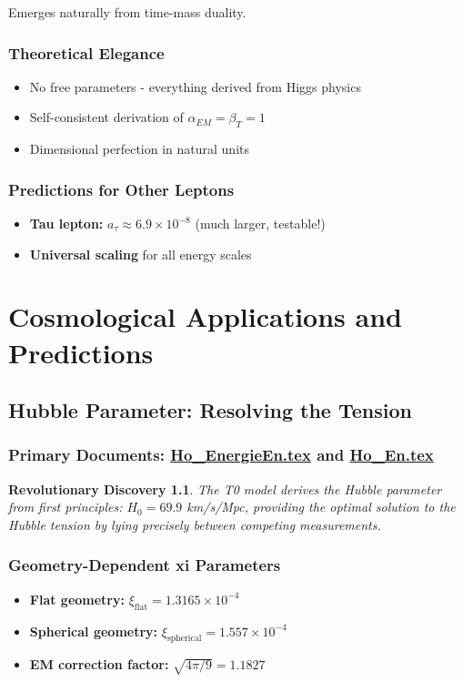 \documentclass[12pt,a4paper]{report}
\newtheorem{discovery}{Revolutionary Discovery}[chapter]
\begin{document}
	Emerges naturally from time-mass duality.
	
	\subsection{Theoretical Elegance}
	\begin{itemize}
		\item No free parameters - everything derived from Higgs physics
		\item Self-consistent derivation of $\alpha_{EM} = \beta_T = 1$
		\item Dimensional perfection in natural units
	\end{itemize}
	
	\subsection{Predictions for Other Leptons}
	\begin{itemize}
		\item \textbf{Tau lepton:} $a_\tau \approx 6.9 \times 10^{-8}$ (much larger, testable!)
		\item \textbf{Universal scaling} for all energy scales
	\end{itemize}
	
	\chapter{Cosmological Applications and Predictions}
	
	\section{Hubble Parameter: Resolving the Tension}
	\subsection{Primary Documents: \href{https://github.com/jpascher/T0-Time-Mass-Duality/tree/main/2/pdf/Ho_EnergieEn.pdf}{Ho\_EnergieEn.tex} and \href{https://github.com/jpascher/T0-Time-Mass-Duality/tree/main/2/pdf/Ho_En.pdf}{Ho\_En.tex}}
	
	\begin{discovery}
		The T0 model derives the Hubble parameter from first principles: $H_0 = 69.9$ km/s/Mpc, providing the optimal solution to the Hubble tension by lying precisely between competing measurements.
	\end{discovery}
	
	\subsection{Geometry-Dependent xi Parameters}
	\begin{itemize}
		\item \textbf{Flat geometry:} $\xi_{\text{flat}} = 1.3165 \times 10^{-4}$
		\item \textbf{Spherical geometry:} $\xi_{\text{spherical}} = 1.557 \times 10^{-4}$
		\item \textbf{EM correction factor:} $\sqrt{4\pi/9} = 1.1827$
	\end{itemize}
	
\end{document}
